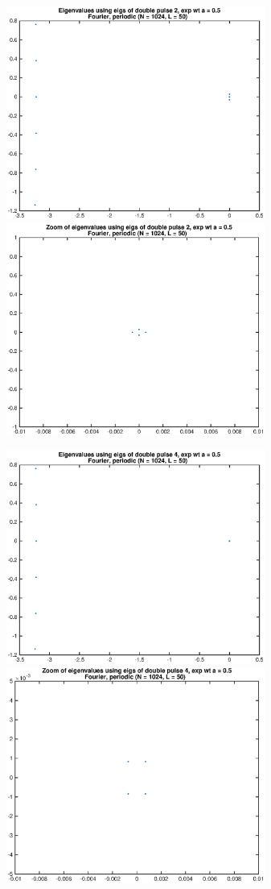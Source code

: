 \documentclass[12pt]{article}
\begin{document}
\begin{figure}[H]
\includegraphics[width=8.5cm]{fourierD2eigs.eps}
\includegraphics[width=8.5cm]{fourierD2eigszoom.eps}
\end{figure}
\begin{figure}[H]
\includegraphics[width=8.5cm]{fourierD4eigs.eps}
\includegraphics[width=8.5cm]{fourierD4eigszoom.eps}
\end{figure}
\end{document}
